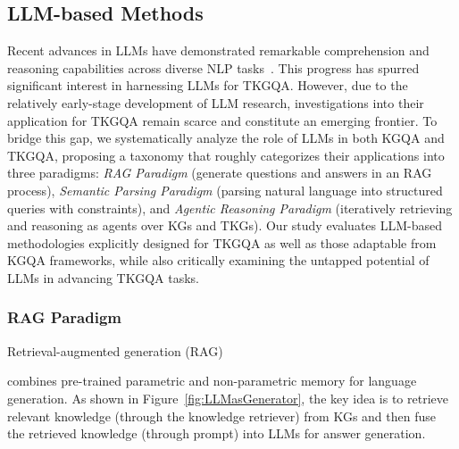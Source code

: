 {\subsection{LLM-based Methods\label{sec-llm}}
Recent advances in LLMs have demonstrated remarkable comprehension and reasoning capabilities across diverse NLP tasks~\cite{achiam2023gpt}. This progress has spurred significant interest in harnessing LLMs for TKGQA. However, due to the relatively early-stage development of LLM research, investigations into their application for TKGQA remain scarce and constitute an emerging frontier. To bridge this gap, we systematically analyze the role of LLMs in both KGQA and TKGQA, proposing a taxonomy that roughly categorizes their applications into three paradigms: \textit{RAG Paradigm} (generate questions and answers in an RAG process), \textit{Semantic Parsing Paradigm} (parsing natural language into structured queries with constraints), and \textit{Agentic Reasoning Paradigm} (iteratively retrieving and reasoning as agents over KGs and TKGs). Our study evaluates LLM-based methodologies explicitly designed for TKGQA as well as those adaptable from KGQA frameworks, while also critically examining the untapped potential of LLMs in advancing TKGQA tasks.  

\subsubsection{RAG Paradigm}
Retrieval-augmented generation (RAG)~\cite{lewisRetrievalAugmentedGenerationKnowledgeIntensive2021}} combines pre-trained parametric and non-parametric memory for language generation. As shown in Figure~\ref{fig:LLMasGenerator}, the key idea is to retrieve relevant knowledge (through the knowledge retriever) from KGs and then fuse the retrieved knowledge (through prompt) into LLMs for answer generation.

